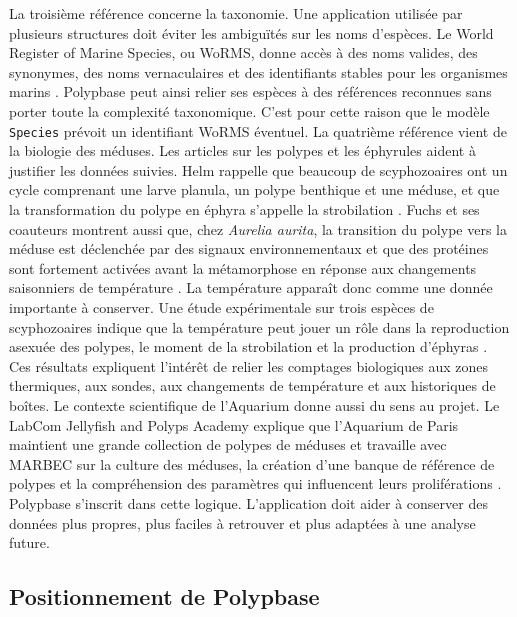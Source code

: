 \documentclass{article}
\begin{document}
La troisième référence concerne la taxonomie. Une application utilisée par plusieurs structures doit éviter les ambiguïtés sur les noms d’espèces. Le World Register of Marine Species, ou WoRMS, donne accès à des noms valides, des synonymes, des noms vernaculaires et des identifiants stables pour les organismes marins \cite{worms}. Polypbase peut ainsi relier ses espèces à des références reconnues sans porter toute la complexité taxonomique. C’est pour cette raison que le modèle \texttt{Species} prévoit un identifiant WoRMS éventuel.
La quatrième référence vient de la biologie des méduses. Les articles sur les polypes et les éphyrules aident à justifier les données suivies. Helm rappelle que beaucoup de scyphozoaires ont un cycle comprenant une larve planula, un polype benthique et une méduse, et que la transformation du polype en éphyra s’appelle la strobilation \cite{helm2018}. Fuchs et ses coauteurs montrent aussi que, chez \textit{Aurelia aurita}, la transition du polype vers la méduse est déclenchée par des signaux environnementaux et que des protéines sont fortement activées avant la métamorphose en réponse aux changements saisonniers de température \cite{fuchs2014}.
La température apparaît donc comme une donnée importante à conserver. Une étude expérimentale sur trois espèces de scyphozoaires indique que la température peut jouer un rôle dans la reproduction asexuée des polypes, le moment de la strobilation et la production d’éphyras \cite{scypho2019}. Ces résultats expliquent l’intérêt de relier les comptages biologiques aux zones thermiques, aux sondes, aux changements de température et aux historiques de boîtes.
Le contexte scientifique de l’Aquarium donne aussi du sens au projet. Le LabCom Jellyfish and Polyps Academy explique que l’Aquarium de Paris maintient une grande collection de polypes de méduses et travaille avec MARBEC sur la culture des méduses, la création d’une banque de référence de polypes et la compréhension des paramètres qui influencent leurs proliférations \cite{jpa-laboratoire}. Polypbase s’inscrit dans cette logique. L’application doit aider à conserver des données plus propres, plus faciles à retrouver et plus adaptées à une analyse future.

\subsection{Positionnement de Polypbase}
\end{document}
